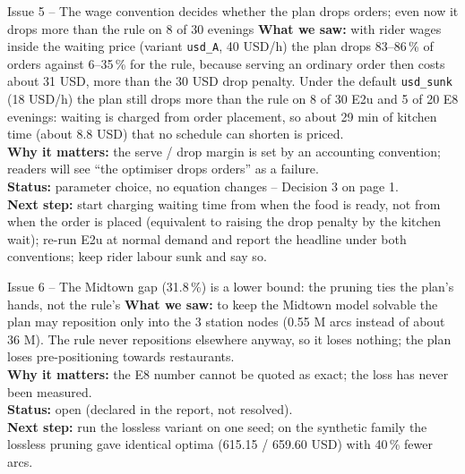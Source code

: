 \begin{issuebox}{Issue 5 -- The wage convention decides whether the plan drops orders; even now it drops more than the rule on 8 of 30 evenings}
\textbf{What we saw:} with rider wages inside the waiting price (variant \texttt{usd\_A}, 40 USD/h) the plan drops 83--86\,\% of orders against 6--35\,\% for the rule, because serving an ordinary order then costs about 31 USD, more than the 30 USD drop penalty. Under the default \texttt{usd\_sunk} (18 USD/h) the plan still drops more than the rule on 8 of 30 E2u and 5 of 20 E8 evenings: waiting is charged from order placement, so about 29 min of kitchen time (about 8.8 USD) that no schedule can shorten is priced.\\
\textbf{Why it matters:} the serve / drop margin is set by an accounting convention; readers will see ``the optimiser drops orders'' as a failure.\\
\textbf{Status:} parameter choice, no equation changes -- Decision 3 on page 1.\\
\textbf{Next step:} start charging waiting time from when the food is ready, not from when the order is placed (equivalent to raising the drop penalty by the kitchen wait); re-run E2u at normal demand and report the headline under both conventions; keep rider labour sunk and say so.
\end{issuebox}

\begin{issuebox}{Issue 6 -- The Midtown gap (31.8\,\%) is a lower bound: the pruning ties the plan's hands, not the rule's}
\textbf{What we saw:} to keep the Midtown model solvable the plan may reposition only into the 3 station nodes (0.55 M arcs instead of about 36 M). The rule never repositions elsewhere anyway, so it loses nothing; the plan loses pre-positioning towards restaurants.\\
\textbf{Why it matters:} the E8 number cannot be quoted as exact; the loss has never been measured.\\
\textbf{Status:} open (declared in the report, not resolved).\\
\textbf{Next step:} run the lossless variant on one seed; on the synthetic family the lossless pruning gave identical optima (615.15 / 659.60 USD) with 40\,\% fewer arcs.
\end{issuebox}

